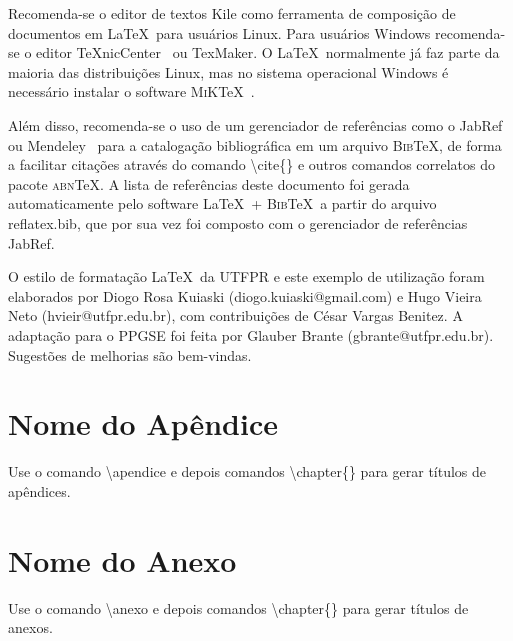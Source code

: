 \documentclass[openright]{normas-utf-tex} %
\begin{document}
Recomenda-se o editor de textos Kile como ferramenta de composição de documentos em \LaTeX\ para usuários Linux. Para usuários Windows recomenda-se o editor \TeX nicCenter~\cite{TeXnicCenter2009} ou TexMaker. O \LaTeX\ normalmente já faz parte da maioria das distribuições Linux, mas no sistema operacional Windows é necessário instalar o software \textsc{MiK}\TeX~\cite{MiKTeX2009}.

Além disso, recomenda-se o uso de um gerenciador de referências como o JabRef~\cite{JabRef2009} ou Mendeley~\cite{Mendeley2009} para a catalogação bibliográfica em um arquivo \textsc{Bib}\TeX, de forma a facilitar citações através do comando {\ttfamily \textbackslash cite\{\}} e outros comandos correlatos do pacote \textsc{abn}\TeX. A lista de referências deste documento foi gerada automaticamente pelo software \LaTeX\ + \textsc{Bib}\TeX\ a partir do arquivo {\ttfamily reflatex.bib}, que por sua vez foi composto com o gerenciador de referências JabRef.

O estilo de formatação \LaTeX\ da UTFPR e este exemplo de utilização foram elaborados por Diogo Rosa Kuiaski (diogo.kuiaski@gmail.com) e Hugo Vieira Neto (hvieir@utfpr.edu.br), com contribuições de César Vargas Benitez. A adaptação para o PPGSE foi feita por Glauber Brante (gbrante@utfpr.edu.br). Sugestões de melhorias são bem-vindas.



\clearpage %
\label{bibstart}
\label{bibend}


\apendice
\chapter{Nome do Apêndice}
\label{chap:apendice}

Use o comando {\ttfamily \textbackslash apendice} e depois comandos {\ttfamily \textbackslash chapter\{\}}
para gerar títulos de apêndices.


\anexo
\chapter{Nome do Anexo}
\label{chap:anexo}

Use o comando {\ttfamily \textbackslash anexo} e depois comandos {\ttfamily \textbackslash chapter\{\}}
para gerar títulos de anexos.
\end{document}
